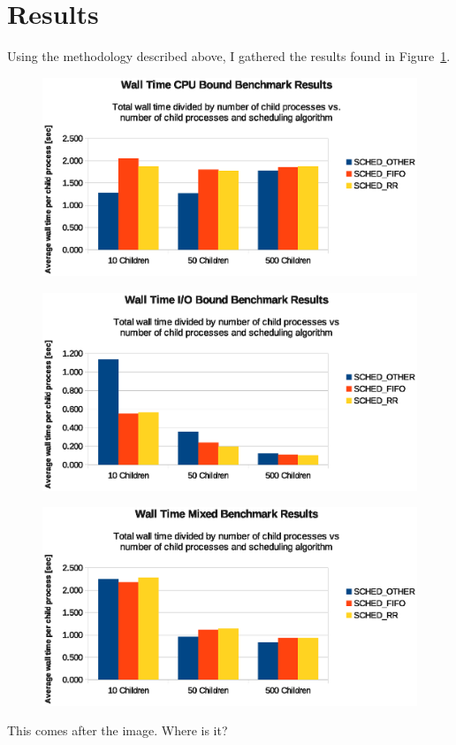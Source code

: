 ﻿\section{Results}

Using the methodology described above, I gathered the results found in Figure~\ref{fig:cpu-wall-child}.  

\begin{figure}[H]
  \centering
  \includegraphics[scale=0.8]{img/cpu-wall-child.eps}
  \caption{}
  \label{fig:cpu-wall-child}
\end{figure}

\begin{figure}[H]
  \centering
  \includegraphics[scale=0.8]{img/io-wall-child.eps}
  \caption{}
  \label{fig:io-wall-child}
\end{figure}

\begin{figure}[H]
  \centering
  \includegraphics[scale=0.8]{img/mix-wall-child.eps}
  \caption{}
  \label{fig:mix-wall-child}
\end{figure}

This comes after the image. Where is it?
